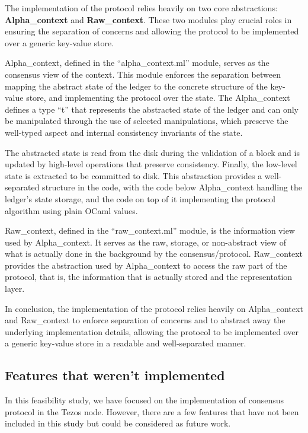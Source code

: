 The implementation of the protocol relies heavily on two core abstractions: \textbf{Alpha\_context} and \textbf{Raw\_context}. These two modules play crucial roles in ensuring the separation of concerns and allowing the protocol to be implemented over a generic key-value store.

Alpha\_context, defined in the ``alpha\_context.ml'' module, serves as the consensus view of the context. This module enforces the separation between mapping the abstract state of the ledger to the concrete structure of the key-value store, and implementing the protocol over the state. The Alpha\_context defines a type ``t'' that represents the abstracted state of the ledger and can only be manipulated through the use of selected manipulations, which preserve the well-typed aspect and internal consistency invariants of the state.

The abstracted state is read from the disk during the validation of a block and is updated by high-level operations that preserve consistency. Finally, the low-level state is extracted to be committed to disk. This abstraction provides a well-separated structure in the code, with the code below Alpha\_context handling the ledger’s state storage, and the code on top of it implementing the protocol algorithm using plain OCaml values.

Raw\_context, defined in the ``raw\_context.ml'' module, is the information view used by Alpha\_context. It serves as the raw, storage, or non-abstract view of what is actually done in the background by the consensus/protocol. Raw\_context provides the abstraction used by Alpha\_context to access the raw part of the protocol, that is, the information that is actually stored and the representation layer.

In conclusion, the implementation of the protocol relies heavily on Alpha\_context and Raw\_context to enforce separation of concerns and to abstract away the underlying implementation details, allowing the protocol to be implemented over a generic key-value store in a readable and well-separated manner.

\subsection*{Features that weren't implemented}
In this feasibility study, we have focused on the implementation of consensus protocol in the Tezos node. However, there are a few features that have not been included in this study but could be considered as future work.

